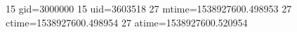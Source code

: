 15 gid=3000000
15 uid=3603518
27 mtime=1538927600.498953
27 ctime=1538927600.498954
27 atime=1538927600.520954

